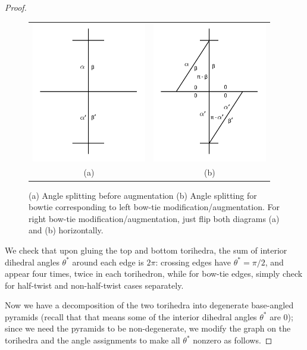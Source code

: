 \documentclass[11pt]{amsart}
\theoremstyle{plain}
\theoremstyle{definition}
\begin{document}
\begin{proof}
\begin{figure}
\begin{tabular}{cc}
\includegraphics[width = 5cm]{before_bowtie_angles.png}&
\includegraphics[width = 5cm]{bowtie_angles.png}\\
(a)&(b)
\end{tabular}
\caption{(a) Angle splitting before augmentation 
(b) Angle splitting for bowtie corresponding to
left bow-tie modification/augmentation.
For right bow-tie modification/augmentation,
just flip both diagrams (a) and (b) horizontally.}
\label{f:bowtie_angles2}
\end{figure}

We check that upon gluing the top and bottom torihedra,
the sum of interior dihedral angles $\theta^*$
around each edge is $2\pi$:
crossing edges have $\theta^* = \pi/2$,
and appear four times, twice in each torihedron,
while for bow-tie edges,
simply check for half-twist and non-half-twist cases
separately.


Now we have a decomposition of the two torihedra into
degenerate base-angled pyramids
(recall that that means some of the
interior dihedral angles $\theta^*$ are 0);
since we need the pyramids to be non-degenerate,
we modify the graph on the torihedra
and the angle assignments to make all $\theta^*$ nonzero
as follows.



\end{proof}
\end{document}
